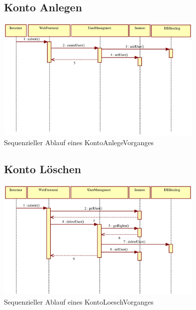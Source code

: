 \documentclass[a4paper,11pt]{scrartcl}
\begin{document}
\begin{figure}[h]
\subsection{Konto Anlegen}
		\centering
		\includegraphics[width=0.90\textwidth]{images/seq03_KontoAnlegen.eps}
		\caption{Sequenzieller Ablauf eines KontoAnlegeVorganges}
		\label{seq03}
\end{figure}


\begin{figure}[h]
\subsection{Konto Löschen}
		\centering
		\includegraphics[width=0.90\textwidth]{images/seq04_KontoLoeschen.eps}
		\caption{Sequenzieller Ablauf eines KontoLoeschVorganges}
		\label{seq04}
\end{figure}
\end{document}
